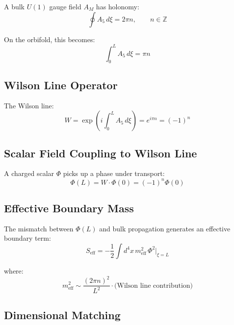 \documentclass[11pt,a4paper]{article}
\theoremstyle{definition}
\theoremstyle{plain}
\theoremstyle{remark}
\begin{document}
A bulk $U(1)$ gauge field $A_M$ has holonomy:
\begin{equation}
\oint A_5 \, d\xi = 2\pi n, \qquad n \in \mathbb{Z}
\label{eq:gauge-holonomy}
\end{equation}

On the orbifold, this becomes:
\begin{equation}
\int_0^L A_5 \, d\xi = \pi n
\label{eq:orbifold-holonomy}
\end{equation}

\subsection{Wilson Line Operator}

The Wilson line:
\begin{equation}
W = \exp\left(i\int_0^L A_5 \, d\xi\right) = e^{i\pi n} = (-1)^n
\label{eq:wilson-line}
\end{equation}

\subsection{Scalar Field Coupling to Wilson Line}

A charged scalar $\Phi$ picks up a phase under transport:
\begin{equation}
\Phi(L) = W \cdot \Phi(0) = (-1)^n \Phi(0)
\label{eq:scalar-transport}
\end{equation}

\subsection{Effective Boundary Mass}

The mismatch between $\Phi(L)$ and bulk propagation generates an effective
boundary term:
\begin{equation}
S_{\mathrm{eff}} = -\frac{1}{2}\int d^4x \, m_{\mathrm{eff}}^2 \, \Phi^2\big|_{\xi=L}
\label{eq:S-eff}
\end{equation}

where:
\begin{equation}
m_{\mathrm{eff}}^2 \sim \frac{(2\pi n)^2}{L^2} \cdot \text{(Wilson line contribution)}
\label{eq:m-eff}
\end{equation}

\subsection{Dimensional Matching}
\end{document}
